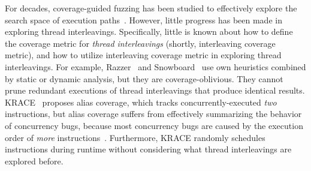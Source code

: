 

For decades, coverage-guided fuzzing has been studied to effectively
explore the search space of execution paths~\cite{janus, hydra,
  healer, imf, hfl, syzkaller, klee, s2e, kafl}.
%
However, little progress has been made in exploring thread
interleavings.
%
Specifically, little is known about how to define the coverage metric
for \textit{thread interleavings} (shortly, interleaving coverage
metric), and how to utilize interleaving coverage metric in exploring
thread interleavings.
%
For example, Razzer~\cite{razzer} and Snowboard~\cite{snowboard} use
own heuristics combined by static or dynamic analysis, but they are
coverage-oblivious.  They cannot prune redundant executions of thread
interleavings that produce identical results.
%
KRACE~\cite{krace} proposes alias coverage, which tracks
concurrently-executed \textit{two} instructions, but alias coverage
suffers from effectively summarizing the behavior of concurrency bugs,
because most concurrency bugs are caused by the execution order of
\textit{more} instructions~\cite{learningfrommistakes}.  Furthermore,
KRACE randomly schedules instructions during runtime without
considering what thread interleavings are explored before.

